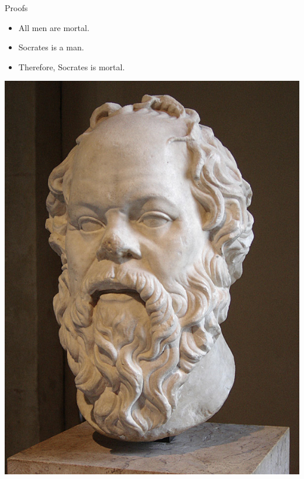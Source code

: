 \begin{frame}{Proofs}
	\begin{minipage}{0.5\textwidth}
		\begin{itemize}
			\item All men are mortal.
			\item Socrates is a man.
			\item Therefore, Socrates is mortal.
		\end{itemize}
	\end{minipage}
	\hspace{2em}
	\begin{minipage}{0.4\textwidth}
		\includegraphics[width=1.0\textwidth]{figures/socrates.jpg}\\
		\centering \color{gray}{Eric Gaba (CC by-nc-sa 2.5)}
    \end{minipage}


\end{frame}
